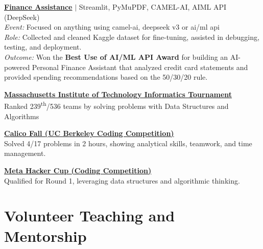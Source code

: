 \documentclass[a4paper,12pt]{article}
\begin{document}
\vspace{0.5em}

\textbf{\href{https://lablab.ai/event/fall-in-love-with-deepseek/shallowseekers/ai-powered-personal-finance-assistant}{Finance Assistance}} 
$|$ Streamlit, PyMuPDF, CAMEL-AI, AIML API (DeepSeek) \\
\textit{Event:} Focused on anything using camel-ai, deepseek v3 or ai/ml api \\
\textit{Role:} Collected and cleaned Kaggle dataset for fine-tuning, assisted in debugging, testing, and deployment. \\
\textit{Outcome:} Won the \textbf{Best Use of AI/ML API Award} for building an AI-powered Personal Finance Assistant that analyzed credit card statements and provided spending recommendations based on the 50/30/20 rule.

\vspace{0.5em}


\textbf{\href{https://www.linkedin.com/posts/muhammad-qasim-gill_mit2winter2025-teamicodegurupro-problemsolving-activity-7287252831252680704-BMRf?utm_source=share&utm_medium=member_desktop&rcm=ACoAACG6gOwBnlfoWP0KSUXYMZV0hE4WXwmWsBQ}{Massachusetts Institute of Technology Informatics Tournament}} \\
Ranked 239\textsuperscript{th}/536 teams by solving problems with Data Structures and Algorithms


\vspace{0.5em}


\textbf{\href{https://drive.google.com/file/d/1m7mCVE9o4MydZOjpE6-6a_idNBluioeA/view?usp=drive_link}{Calico Fall (UC Berkeley Coding Competition)}} \\
Solved 4/17 problems in 2 hours, showing analytical skills, teamwork, and time management.

\vspace{0.5em}

\textbf{\href{https://drive.google.com/file/d/1HeAbr-IcT9DLcyxMDckvL4oIVeadHqbU/view}{Meta Hacker Cup (Coding Competition)}} \\
Qualified for Round 1, leveraging data structures and algorithmic thinking.


\section{Volunteer Teaching and Mentorship}
\end{document}
